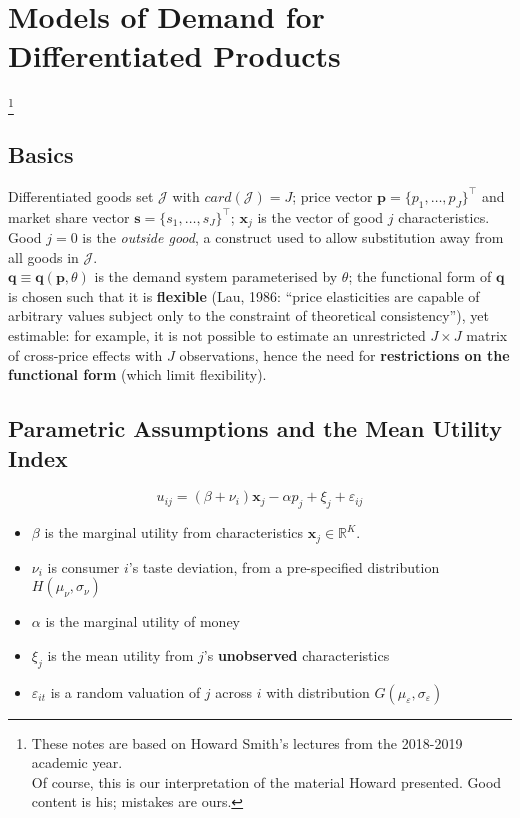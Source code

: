 \documentclass[11pt]{article}
\newcommand\blfootnote[1]{%
	\begingroup
	\renewcommand\thefootnote{}\footnote{#1}%
	\addtocounter{footnote}{-1}%
	\endgroup
}
\begin{document}
\onehalfspacing

\section{Models of Demand for Differentiated Products}

\blfootnote{These notes are based on Howard Smith's lectures from the 2018-2019 academic year.\\
Of course, this is our interpretation of the material Howard presented. Good content is his; mistakes are ours.}

\vspace{-1cm}
\subsection{Basics}

Differentiated goods set $\mathscr{J}$ with $card(\mathscr{J}) = J$; price vector $\mathbf{p} = \{p_1, \dots, p_J\}^\intercal$ and market share vector $\mathbf{s} = \{s_1, \dots, s_J\}^\intercal$; $\mathbf{x}_j$ is the vector of good $j$ characteristics.
Good $j=0$ is the \textit{outside good}, a construct used to allow substitution away from all goods in $\mathscr{J}$. \\

$\mathbf{q} \equiv \mathbf{q}(\mathbf{p},\theta)$ is the demand system parameterised by $\theta$; the functional form of $\mathbf{q}$ is chosen such that it is \textbf{flexible} (Lau, 1986: ``price elasticities are capable of arbitrary values subject only to the constraint of theoretical consistency''), yet estimable: for example, it is not possible to estimate an unrestricted $J \times J$ matrix of cross-price effects with $J$ observations, hence the need for \textbf{restrictions on the functional form} (which limit flexibility).

\subsection{Parametric Assumptions and the Mean Utility Index}
\begin{equation}
	\label{parass}
	u_{ij} = (\beta + \nu_i)\mathbf{x}_j - \alpha p_j + \xi_j + \varepsilon_{ij}
\end{equation}
\begin{itemize}
	\item $\beta$ is the marginal utility from characteristics $\mathbf{x}_j \in \mathbb{R}^K$.
	\item $\nu_i$ is consumer $i$'s taste deviation, from a pre-specified distribution $H(\mu_\nu,\sigma_\nu)$
	\item $\alpha$ is the marginal utility of money
	\item $\xi_j$ is the mean utility from $j$'s \textbf{unobserved} characteristics
	\item $\varepsilon_{it}$ is a random valuation of $j$ across $i$ with distribution $G(\mu_\varepsilon, \sigma_\varepsilon)$
\end{itemize}
\end{document}
